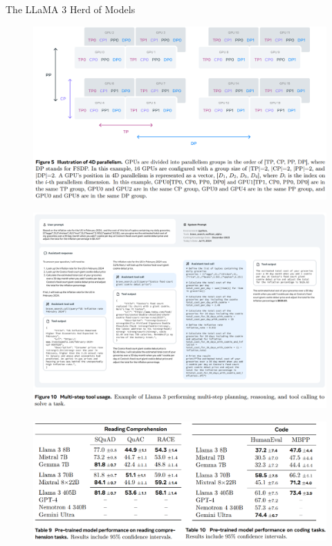 \begin{frame}[allowframebreaks]{The LLaMA 3 Herd of Models}
    \begin{figure}
        \centering
        \includegraphics[height=0.88\textheight,width=1.08\textwidth,keepaspectratio]{images/recent-advance/llama-3-4d-parallel.png}
    \end{figure}
    
\framebreak

    \begin{figure}
        \centering
        \includegraphics[height=0.88\textheight,width=1.08\textwidth,keepaspectratio]{images/recent-advance/llama-3-example.png}
    \end{figure}
    
\framebreak

    \begin{figure}
        \centering
        \includegraphics[height=0.88\textheight,width=1.05\textwidth,keepaspectratio]{images/recent-advance/llama-3-compare.png}
    \end{figure}
    

\end{frame}

